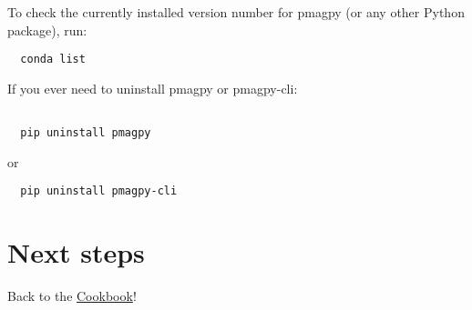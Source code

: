\documentclass[11pt]{article}
\begin{document}
To check the currently installed version number for pmagpy (or any other Python package), run:
\begin{verbatim}
  conda list
\end{verbatim}

If you ever need to uninstall pmagpy or pmagpy-cli:

\begin{verbatim}

  pip uninstall pmagpy
\end{verbatim}
  or
\begin{verbatim}
  pip uninstall pmagpy-cli
\end{verbatim}

\section{Next steps}

Back to the \href{https://earthref.org/PmagPy/cookbook/#next_steps}{Cookbook}!
\end{document}
